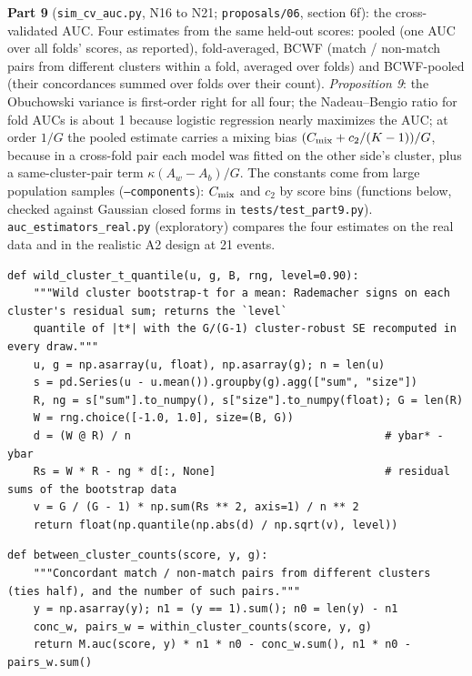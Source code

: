 \documentclass[11pt]{article}
\begin{document}
\textbf{Part 9} (\texttt{sim\_cv\_auc.py}, N16 to N21; \texttt{proposals/06}, section 6f): the cross-validated AUC. Four estimates
from the same held-out scores: pooled (one AUC over all folds' scores, as reported), fold-averaged, BCWF (match /
non-match pairs from different clusters within a fold, averaged over folds) and BCWF-pooled (their concordances summed
over folds over their count). \emph{Proposition 9}: the Obuchowski variance is first-order right for all four; the
Nadeau--Bengio ratio for fold AUCs is about 1 because logistic regression nearly maximizes the AUC; at order $1/G$ the
pooled estimate carries a mixing bias $(C_{\rm mix}+c_2/(K-1))/G$, because in a cross-fold pair each model was fitted on the
other side's cluster, plus a same-cluster-pair term $\kappa(A_w-A_b)/G$. The constants come from large population samples
(\texttt{--components}): $C_{\rm mix}$ and $c_2$ by score bins (functions below, checked against Gaussian closed forms in
\texttt{tests/test\_part9.py}). \texttt{auc\_estimators\_real.py} (exploratory) compares the four estimates on the real data
and in the realistic A2 design at 21 events.

\begin{lstlisting}[caption={Wild cluster bootstrap-t quantile (scripts/sim\_cv\_sizes.py)}]
def wild_cluster_t_quantile(u, g, B, rng, level=0.90):
    """Wild cluster bootstrap-t for a mean: Rademacher signs on each cluster's residual sum; returns the `level`
    quantile of |t*| with the G/(G-1) cluster-robust SE recomputed in every draw."""
    u, g = np.asarray(u, float), np.asarray(g); n = len(u)
    s = pd.Series(u - u.mean()).groupby(g).agg(["sum", "size"])
    R, ng = s["sum"].to_numpy(), s["size"].to_numpy(float); G = len(R)
    W = rng.choice([-1.0, 1.0], size=(B, G))
    d = (W @ R) / n                                       # ybar* - ybar
    Rs = W * R - ng * d[:, None]                          # residual sums of the bootstrap data
    v = G / (G - 1) * np.sum(Rs ** 2, axis=1) / n ** 2
    return float(np.quantile(np.abs(d) / np.sqrt(v), level))
\end{lstlisting}

\begin{lstlisting}[caption={Between-cluster concordances (BCWF) (scripts/sim\_cv\_auc.py)}]
def between_cluster_counts(score, y, g):
    """Concordant match / non-match pairs from different clusters (ties half), and the number of such pairs."""
    y = np.asarray(y); n1 = (y == 1).sum(); n0 = len(y) - n1
    conc_w, pairs_w = within_cluster_counts(score, y, g)
    return M.auc(score, y) * n1 * n0 - conc_w.sum(), n1 * n0 - pairs_w.sum()
\end{lstlisting}
\end{document}
